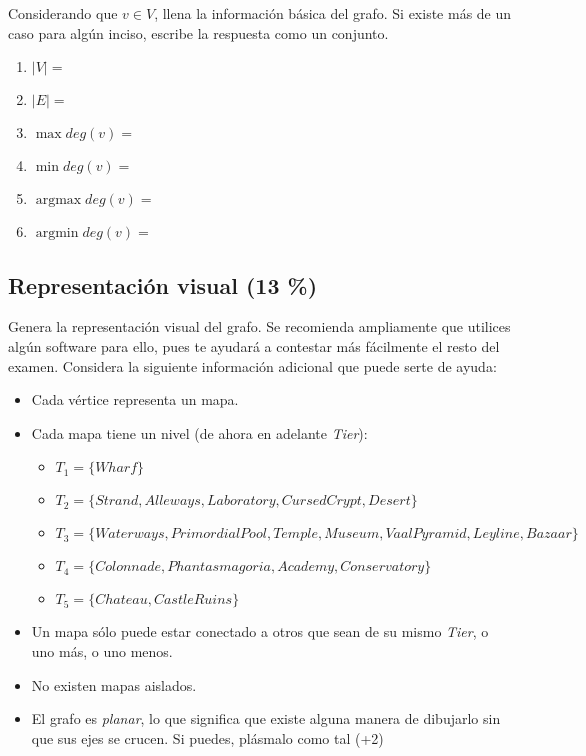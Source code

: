 \documentclass{article}
\DeclareMathOperator*{\argmin}{argmin} %
\DeclareMathOperator*{\argmax}{argmax} %
\begin{document}
Considerando que $v \in V$, llena la información básica del grafo.
Si existe más de un caso para algún inciso, escribe la respuesta como un conjunto.

\begin{enumerate}[label=\tt \alph*)]
    \item $|V| =$
    \item $|E| =$
    \item $\max deg(v) =$
    \item $\min deg(v) =$
    \item $\argmax deg(v) =$
    \item $\argmin deg(v) =$
\end{enumerate}

\subsection{Representación visual (13 \%)}

Genera la representación visual del grafo. Se recomienda ampliamente que utilices algún software para ello, pues te ayudará a contestar más fácilmente el resto del examen. Considera la siguiente información adicional que puede serte de ayuda:

\begin{itemize}
    \item Cada vértice representa un mapa.
    \item Cada mapa tiene un nivel (de ahora en adelante \textit{Tier}):
    \begin{itemize}
        \item $T_1 = \{Wharf\}$
        \item $T_2 = \{Strand, Alleways, Laboratory, CursedCrypt, Desert\}$
        \item $T_3 = \{Waterways, PrimordialPool, Temple, Museum, VaalPyramid, Leyline, Bazaar\}$
        \item $T_4 = \{Colonnade, Phantasmagoria, Academy, Conservatory\}$
        \item $T_5 = \{Chateau, CastleRuins\}$
    \end{itemize}
    \item Un mapa sólo puede estar conectado a otros que sean de su mismo \textit{Tier}, o uno más, o uno menos.
    \item No existen mapas aislados.
    \item El grafo es \textit{planar}, lo que significa que existe alguna manera de dibujarlo sin que sus ejes se crucen. Si puedes, plásmalo como tal (+2)
\end{itemize}
\end{document}
